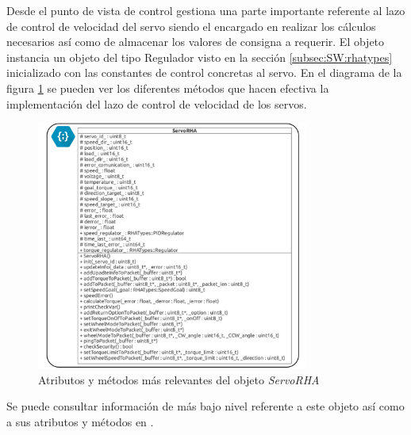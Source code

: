         Desde el punto de vista de control gestiona una parte importante referente al lazo de control de velocidad del servo siendo el encargado en realizar los cálculos necesarios así como de almacenar los valores de consigna a requerir. El objeto  instancia un objeto del tipo Regulador visto en la sección \ref{subsec:SW:rhatypes} inicializado con las constantes de control concretas al servo. En el diagrama de la figura \ref{fig:SW:class_diagram_SRHA} se pueden ver los diferentes métodos que hacen efectiva la implementación del lazo de control de velocidad de los servos.

        \begin{figure}[H]
            \centering
            \includegraphics[width=0.8\textwidth]{figuras/Imagenes_SW/class_diagram_SRHA.jpg}
            \caption{Atributos y métodos más relevantes del objeto \textit{ServoRHA}}
            \label{fig:SW:class_diagram_SRHA}
        \end{figure}

        Se puede consultar información de más bajo nivel referente a este objeto así como a sus atributos y métodos en \cite{rha_doc}.

